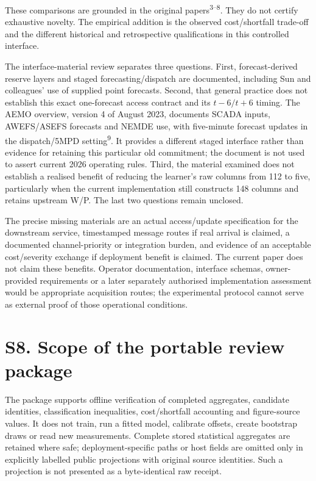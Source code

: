 \documentclass[
  british,
  11pt,
]{article}
\begin{document}
These comparisons are grounded in the original
papers\textsuperscript{3--8}. They do not certify exhaustive novelty.
The empirical addition is the observed cost/shortfall trade-off and the
different historical and retrospective qualifications in this controlled
interface.

The interface-material review separates three questions. First,
forecast-derived reserve layers and staged forecasting/dispatch are
documented, including Sun and colleagues' use of supplied point
forecasts. Second, that general practice does not establish this exact
one-forecast access contract and its \(t-6/t+6\) timing. The AEMO
overview, version 4 of August 2023, documents SCADA inputs, AWEFS/ASEFS
forecasts and NEMDE use, with five-minute forecast updates in the
dispatch/5MPD setting\textsuperscript{9}. It provides a different staged
interface rather than evidence for retaining this particular old
commitment; the document is not used to assert current 2026 operating
rules. Third, the material examined does not establish a realised
benefit of reducing the learner's raw columns from 112 to five,
particularly when the current implementation still constructs 148
columns and retains upstream W/P. The last two questions remain
unclosed.

The precise missing materials are an actual access/update specification
for the downstream service, timestamped message routes if real arrival
is claimed, a documented channel-priority or integration burden, and
evidence of an acceptable cost/severity exchange if deployment benefit
is claimed. The current paper does not claim these benefits. Operator
documentation, interface schemas, owner-provided requirements or a later
separately authorised implementation assessment would be appropriate
acquisition routes; the experimental protocol cannot serve as external
proof of those operational conditions.

\section{S8. Scope of the portable review
package}\label{s8.-scope-of-the-portable-review-package}

The package supports offline verification of completed aggregates,
candidate identities, classification inequalities, cost/shortfall
accounting and figure-source values. It does not train, run a fitted
model, calibrate offsets, create bootstrap draws or read new
measurements. Complete stored statistical aggregates are retained where
safe; deployment-specific paths or host fields are omitted only in
explicitly labelled public projections with original source identities.
Such a projection is not presented as a byte-identical raw receipt.
\end{document}

